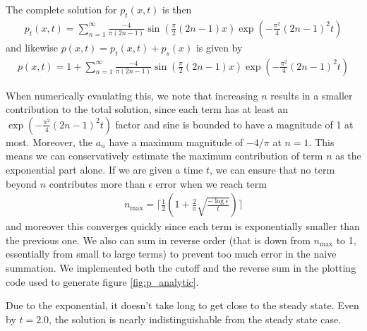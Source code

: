 \documentclass{article}
\begin{document}
The complete solution for $p_t(x,t)$ is then
\begin{align}
    p_t(x,t) = \sum_{n=1}^{\infty} \frac{-4}{\pi (2n - 1)} \sin\left(\frac{\pi}{2} (2n - 1) x\right) \exp\left(-\frac{\pi^2}{4} (2n - 1)^2 t \right)
\end{align}
and likewise $p(x,t) = p_t(x,t) + p_s(x)$ is given by
\begin{align}
    p(x,t) = 1 + \sum_{n=1}^{\infty} \frac{-4}{\pi (2n - 1)} \sin\left(\frac{\pi}{2} (2n - 1) x\right) \exp\left(-\frac{\pi^2}{4} (2n - 1)^2 t \right)
\end{align}

When numerically evaulating this, we note that increasing $n$ results in a smaller contribution to the total solution, since each term has at least an $\exp\left(-\frac{\pi^2}{4} (2n - 1)^2 t \right)$ factor and sine is bounded to have a magnitude of 1 at most.
Moreover, the $a_n$ have a maximum magnitude of $-4/\pi$ at $n=1$.
This means we can conservatively estimate the maximum contribution of term $n$ as the exponential part alone.
If we are given a time $t$, we can ensure that no term beyond $n$ contributes more than $\epsilon$ error when we reach term
\begin{align}
n_{\mathrm{max}} = \Bigg\lceil \frac{1}{2}\left(1 + \frac{2}{\pi} \sqrt{\frac{-\log{\epsilon}}{t}}\right) \Bigg\rceil
\end{align}
and moreover this converges quickly since each term is exponentially smaller than the previous one.
We also can sum in reverse order (that is down from $n_{\mathrm{max}}$ to 1, essentially from small to large terms) to prevent too much error in the naive summation.
We implemented both the cutoff and the reverse sum in the plotting code used to generate figure \ref{fig:p_analytic}.

Due to the exponential, it doesn't take long to get close to the steady state.
Even by $t=2.0$, the solution is nearly indistinguishable from the steady state case.
\end{document}
